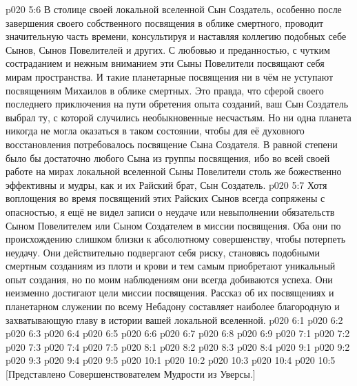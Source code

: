 \vs p020 5:6 В столице своей локальной вселенной Сын Создатель, особенно после завершения своего собственного посвящения в облике смертного, проводит значительную часть времени, консультируя и наставляя коллегию подобных себе Сынов, Сынов Повелителей и других. С любовью и преданностью, с чутким состраданием и нежным вниманием эти Сыны Повелители посвящают себя мирам пространства. И такие планетарные посвящения ни в чём не уступают посвящениям Михаилов в облике смертных. Это правда, что сферой своего последнего приключения на пути обретения опыта созданий, ваш Сын Создатель выбрал ту, с которой случились необыкновенные несчастьям. Но ни одна планета никогда не могла оказаться в таком состоянии, чтобы для её духовного восстановления потребовалось посвящение Сына Создателя. В равной степени было бы достаточно любого Сына из группы посвящения, ибо во всей своей работе на мирах локальной вселенной Сыны Повелители столь же божественно эффективны и мудры, как и их Райский брат, Сын Создатель.
\vs p020 5:7 \pc Хотя воплощения во время посвящений этих Райских Сынов всегда сопряжены с опасностью, я ещё не видел записи о неудаче или невыполнении обязательств Сыном Повелителем или Сыном Создателем в миссии посвящения. Оба они по происхождению слишком близки к абсолютному совершенству, чтобы потерпеть неудачу. Они действительно подвергают себя риску, становясь подобными смертным созданиям из плоти и крови и тем самым приобретают уникальный опыт создания, но по моим наблюдениям они всегда добиваются успеха. Они неизменно достигают цели миссии посвящения. Рассказ об их посвящениях и планетарном служении по всему Небадону составляет наиболее благородную и захватывающую главу в истории вашей локальной вселенной.
\vs p020 6:1 
\vs p020 6:2 \pc 
\vs p020 6:3 
\vs p020 6:4 
\vs p020 6:5 \pc 
\vs p020 6:6 \pc 
\vs p020 6:7 
\vs p020 6:8 
\vs p020 6:9 
\vs p020 7:1 
\vs p020 7:2 
\vs p020 7:3 
\vs p020 7:4 
\vs p020 7:5 
\vs p020 8:1 
\vs p020 8:2 
\vs p020 8:3 
\vs p020 8:4 
\vs p020 9:1 
\vs p020 9:2 
\vs p020 9:3 
\vs p020 9:4 
\vs p020 9:5 \pc 
{}
\vs p020 10:1 
\vs p020 10:2 
\vs p020 10:3 
\vs p020 10:4 
\vsetoff
\vs p020 10:5 [Представлено Совершенствователем Мудрости из Уверсы.]
\quizlink
